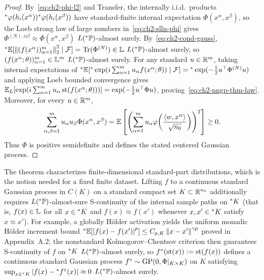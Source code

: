 \begin{proof}
By~\eqref{eq:ch2-phi-l2} and Transfer, the internally i.i.d.\ products ${}^*\varphi(h_i(x^\alpha)){}^*\varphi(h_i(x^\beta))$ have standard-finite internal expectation $\Phi(x^\alpha, x^\beta)$, so the Loeb strong law of large numbers in~\eqref{eq:ch2-slln-phi} gives $\Phi^{(N),\alpha\beta} \approx \Phi(x^\alpha, x^\beta)$ $L({}^*\mathbb{P})$-almost surely. By~\eqref{eq:ch2-cond-gauss}, ${}^*\mathbb{E}[\left\lVert (f(x^\alpha))_{\alpha=1}^{m} \right\rVert_2^2 \mid \mathcal{F}] = \operatorname{Tr}(\Phi^{(N)}) \in \mathbb{L}$ $L({}^*\mathbb{P})$-almost surely, so $(f(x^\alpha; \theta))_{\alpha=1}^{m} \in \mathbb{L}^m$ $L({}^*\mathbb{P})$-almost surely. For any standard $u \in \mathbb{R}^m$, taking internal expectations of ${}^*\mathbb{E}[{}^*\exp(i\sum_{\alpha=1}^{m} u_\alpha f(x^\alpha; \theta)) \mid \mathcal{F}] = {}^*\exp(-\frac{1}{2} u^\top \Phi^{(N)} u)$ and applying Loeb bounded convergence gives $\mathbb{E}_L[\exp(i\sum_{\alpha=1}^{m} u_\alpha \operatorname{st}(f(x^\alpha; \theta)))] = \exp(-\frac{1}{2} u^\top \Phi u)$, proving~\eqref{eq:ch2-nngp-thm-law}. Moreover, for every $u \in \mathbb{R}^m$,
\begin{equation}\label{eq:ch2-phi-psd}
\sum_{\alpha,\beta=1}^{m} u_\alpha u_\beta \Phi(x^\alpha, x^\beta)
= \mathbb{E}\left[ \left( \sum_{\alpha=1}^{m} u_\alpha \varphi\!\left(\frac{\left\langle w, x^\alpha \right\rangle}{\sqrt{n_0}}\right) \right)^2 \right] \ge 0.
\end{equation}
Thus $\Phi$ is positive semidefinite and defines the stated centered Gaussian process.
\end{proof}

\begin{remark}\label{rem:ch2-func-space}
The theorem characterizes finite-dimensional standard-part distributions, which is the notion needed for a fixed finite dataset. Lifting $f$ to a continuous standard Gaussian process in $C(K)$ on a standard compact set $K \subset \mathbb{R}^{n_0}$ additionally requires $L({}^*\mathbb{P})$-almost-sure S-continuity of the internal sample paths on ${}^*K$ (that is, $f(x) \in \mathbb{L}$ for all $x \in {}^*K$ and $f(x) \approx f(x')$ whenever $x, x' \in {}^*K$ satisfy $x \approx x'$). For example, a globally H\"older activation yields the uniform monadic H\"older increment bound ${}^*\mathbb{E}[\left\lvert f(x) - f(x') \right\rvert^p] \le C_{p,K}\left\lVert x - x' \right\rVert^{\gamma p}$ proved in Appendix~A.2; the nonstandard Kolmogorov--Chentsov criterion then guarantees S-continuity of $f$ on ${}^*K$ $L({}^*\mathbb{P})$-almost surely, so $f^\circ(\operatorname{st}(x)) := \operatorname{st}(f(x))$ defines a continuous standard Gaussian process $f^\circ \sim \operatorname{GP}(0, \Phi|_{K \times K})$ on $K$ satisfying $\sup_{x \in {}^*K} \left\lvert f(x) - {}^*f^\circ(x) \right\rvert \approx 0$ $L({}^*\mathbb{P})$-almost surely.
\end{remark}

